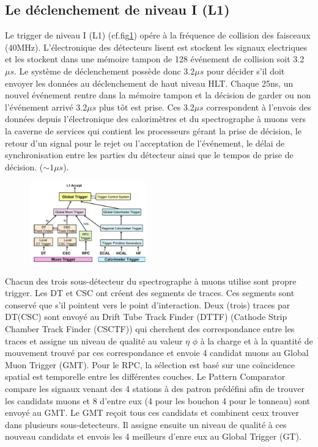 \subsection{Le déclenchement de niveau I (L1)}
Le trigger de niveau I (L1) (cf.fig\ref{L1}) opére à la fréquence de collision des faisceaux (40MHz). L'électronique des détecteurs lisent est stockent les  signaux electriques et les stockent dans une mémoire tampon de 128 événement de collision soit 3.2$\mu s$. Le système de déclenchement possède donc 3.2$\mu s$ pour  décider s'il doit envoyer les données au déclenchement de haut niveau HLT. Chaque 25ns, un nouvel événement rentre dans la mémoire tampon et la décision de garder ou non l'événement arrivé 3.2$\mu s$ plus tôt est prise. Ces 3.2$\mu s$ correspondent à l'envois des données depuis l'électronique des calorimètres et du spectrographe à muons vers la caverne de services qui contient les processeurs gérant la prise de décision, le retour d'un signal pour le rejet ou l'acceptation de l'événement, le délai de synchronisation entre les parties du détecteur ainsi que le tempos de prise de décision. ($\sim1\mu s$). 

	  \begin{figure}[ht!]
	\centering
	\includegraphics[width=0.45\textwidth]{CMS/L1.png}
	\label{L1}
\end{figure}

Chacun des trois sous-détecteur du spectrographe à muons utilise sont propre trigger. Les DT et CSC ont créent des segments de traces. Ces segments sont conservé que s'il pointent vers le point d'interaction. Deux (trois) traces par DT(CSC) sont envoyé au Drift Tube Track Finder (DTTF) (Cathode Strip Chamber Track Finder (CSCTF)) qui cherchent des correspondance entre les traces et assigne un niveau de qualité  au valeur $\eta$ $\phi$ à la charge et à la quantité de mouvement trouvé par ces correspondance et envoie 4 candidat muons au Global Muon Trigger (GMT). Pour le RPC, la sélection est basé sur une coïncidence spatial est temporelle entre les différentes couches. Le Pattern Comparator compare les signaux venant des 4 stations à des patron prédéfini afin de trouver les candidats muons et 8 d'entre eux (4 pour les bouchon 4 pour le tonneau) sont envoyé au GMT. Le GMT reçoit tous ces candidats et combinent ceux trouver dans plusieurs sous-detecteurs. Il assigne ensuite un niveau de qualité à ces nouveau candidats et envois les 4 meilleurs d'enre eux au Global Trigger (GT).

